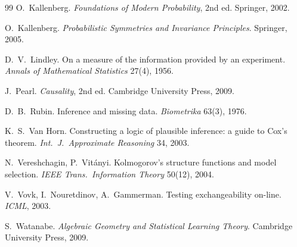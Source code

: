 \documentclass[11pt]{article}
\theoremstyle{definition}
\theoremstyle{plain}
\theoremstyle{remark}
\begin{document}
\begin{thebibliography}{99}
 O.~Kallenberg. \emph{Foundations of Modern
Probability}, 2nd ed. Springer, 2002.

 O.~Kallenberg. \emph{Probabilistic Symmetries
and Invariance Principles}. Springer, 2005.

 D.~V.~Lindley. On a measure of the information
provided by an experiment. \emph{Annals of Mathematical Statistics}
27(4), 1956.

 J.~Pearl. \emph{Causality}, 2nd ed. Cambridge
University Press, 2009.

 D.~B.~Rubin. Inference and missing data.
\emph{Biometrika} 63(3), 1976.

 K.~S.~Van Horn. Constructing a logic of plausible
inference: a guide to Cox's theorem. \emph{Int.\ J.\ Approximate
Reasoning} 34, 2003.

 N.~Vereshchagin, P.~Vit\'anyi. Kolmogorov's
structure functions and model selection. \emph{IEEE Trans.\
Information Theory} 50(12), 2004.

 V.~Vovk, I.~Nouretdinov, A.~Gammerman. Testing
exchangeability on-line. \emph{ICML}, 2003.

 S.~Watanabe. \emph{Algebraic Geometry and
Statistical Learning Theory}. Cambridge University Press, 2009.

\end{thebibliography}
\end{document}
